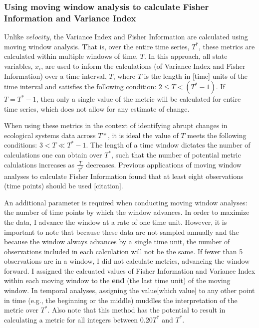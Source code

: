\documentclass[12pt,twoside,openany]{reedthesis}
\begin{document}
\hypertarget{using-moving-window-analysis-to-calculate-fisher-information-and-variance-index}{%
\subsubsection{Using moving window analysis to calculate Fisher Information and Variance Index}\label{using-moving-window-analysis-to-calculate-fisher-information-and-variance-index}}

Unlike \(velocity\), the Variance Index and Fisher Information are calculated using moving window analysis. That is, over the entire time series, \(T^*\), these metrics are calculated within multiple windows of time, \(T\). In this approach, all state variables, \(x_i\), are used to inform the calculations (of Variance Index and Fisher Information) over a time interval, \(T\), where \(T\) is the length in {[}time{]} units of the time interval and satisfies the following condition: \(2\leq T < (T^*-1)\). If \(T = T^*-1\), then only a single value of the metric will be calculated for entire time series, which does not allow for any estimate of change.

When using these metrics in the context of identifying abrupt changes in ecological systems data across \(T*\), it is ideal the value of \(T\) meets the following conditions: \(3 < T \ll T^*-1\). The length of a time window dictates the number of calculations one can obtain over \(T^*\), such that the number of potential metric calulations increases as \(\frac{T}{\ T^*}\) decreases. Previous applications of moving window analyses to calculate Fisher Information found that at least eight observations (time points) should be used {[}citation{]}.

An additional parameter is required when conducting moving window analyses: the number of time points by which the window advances. In order to maximize the data, I advance the window at a rate of one time unit. However, it is important to note that because these data are not sampled annually and the because the window always advances by a single time unit, the number of observations included in each calculation will not be the same. If fewer than 5 observations are in a window, I did not calculate metrics, advancing the window forward.
I assigned the calcuated values of Fisher Information and Variance Index within each moving window to the \textbf{end} (the last time unit) of the moving window. In temporal analyses, assigning the value{[}which value{]} to any other point in time (e.g., the beginning or the middle) muddles the interpretation of the metric over \(T^*\). Also note that this method has the potential to result in calculating a metric for all integers between \(0.20 T^*\) and \(T^*\).
\end{document}
